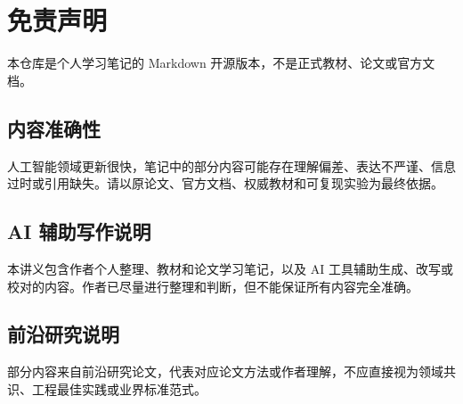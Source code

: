 \hypertarget{ux514dux8d23ux58f0ux660e}{%
\chapter{免责声明}\label{ux514dux8d23ux58f0ux660e}}

本仓库是个人学习笔记的 Markdown 开源版本，不是正式教材、论文或官方文档。

\hypertarget{ux5185ux5bb9ux51c6ux786eux6027}{%
\section{内容准确性}\label{ux5185ux5bb9ux51c6ux786eux6027}}

人工智能领域更新很快，笔记中的部分内容可能存在理解偏差、表达不严谨、信息过时或引用缺失。请以原论文、官方文档、权威教材和可复现实验为最终依据。

\hypertarget{ai-ux8f85ux52a9ux5199ux4f5cux8bf4ux660e}{%
\section{AI 辅助写作说明}\label{ai-ux8f85ux52a9ux5199ux4f5cux8bf4ux660e}}

本讲义包含作者个人整理、教材和论文学习笔记，以及 AI 工具辅助生成、改写或校对的内容。作者已尽量进行整理和判断，但不能保证所有内容完全准确。

\hypertarget{ux524dux6cbfux7814ux7a76ux8bf4ux660e}{%
\section{前沿研究说明}\label{ux524dux6cbfux7814ux7a76ux8bf4ux660e}}

部分内容来自前沿研究论文，代表对应论文方法或作者理解，不应直接视为领域共识、工程最佳实践或业界标准范式。

\clearpage
